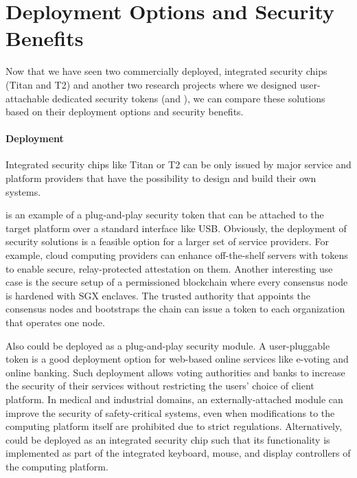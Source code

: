 
\section*{Deployment Options and Security Benefits}

Now that we have seen two commercially deployed, integrated security chips (Titan and T2) and another two research projects where we designed user-attachable dedicated security tokens (\protection and \proximitee), we can compare these solutions based on their deployment options and security benefits. 

\paragraph{Deployment}
Integrated security chips like Titan or T2 can be only issued by major service and platform providers that have the possibility to design and build their own systems. 

\proximitee is an example of a plug-and-play security token that can be attached to the target platform over a standard interface like USB. Obviously, the deployment of security solutions is a feasible option for a larger set of service providers. For example, cloud computing providers can enhance off-the-shelf servers with \proximitee tokens to enable secure, relay-protected attestation on them. Another interesting use case is the secure setup of a permissioned blockchain where every consensus node is hardened with SGX enclaves. The trusted authority that appoints the consensus nodes and bootstraps the chain can issue a \key token to each organization that operates one node.

Also \protection could be deployed as a plug-and-play security module. A user-pluggable token is a good deployment option for web-based online services like e-voting and online banking. Such deployment allows voting authorities and banks to increase the security of their services without restricting the users’ choice of client platform. In medical and industrial domains, an externally-attached \protection module can improve the security of safety-critical systems, even when modifications to the computing platform itself are prohibited due to strict regulations. Alternatively, \protection could be deployed as an integrated security chip such that its functionality is implemented as part of the integrated keyboard, mouse, and display controllers of the computing platform. 


